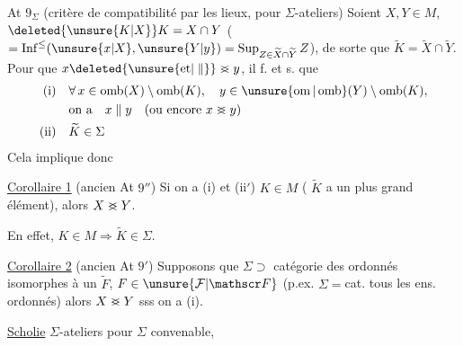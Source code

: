 At $9_{\Sigma}$ (critère de compatibilité par les lieux, pour $\Sigma$-ateliers) Soient $X,Y\in M$,  $\deleted{\unsure{K|X}}K=X\cap Y$ ($=\operatorname{Inf}^{\leq}(\unsure{x|X},\unsure{Y|y})=\operatorname{Sup}_{Z\in\widetilde X\cap\widetilde Y} Z$), de sorte que $\widetilde K=\widetilde X\cap\widetilde Y$. Pour que $x\deleted{\unsure{\text{et}|\parallel}}\mathrel{>\mkern-14mu<}y$,   il \deleted{\unsure{(}}f. et \deleted{\unsure{)}}s. que
\[
\begin{aligned}
\text{(i)}\quad &\forall\,x\in\operatorname{omb}(X)\setminus\operatorname{omb}(K),\quad y\in\unsure{\operatorname{om}|\operatorname{omb}}(Y)\setminus\operatorname{omb}(K),\\
&\text{on a}\quad x\parallel y\quad\text{(ou encore }x\mathrel{>\mkern-14mu<}y\text{)}\\
\text{(ii)}\quad &\widetilde K\in\Sigma
\end{aligned}
\]
Cela implique donc

\uline{Corollaire 1} (ancien At $9''$) Si on a (i) et (ii$'$) $K\in M$ ( $\widetilde K$ a un plus grand élément), alors $X\mathrel{>\mkern-14mu<}Y$.

En effet,  $K\in M\Longrightarrow\widetilde K\in\Sigma$.

\uline{Corollaire 2} (ancien At $9'$) Supposons que $\Sigma\supset$ catégorie des  ordonnés isomorphes à un $\widetilde F$, $F\in\unsure{\mathcal F|\mathscr F}$ (p.ex. $\Sigma={}$cat.  tous les ens. ordonnés) alors $X\mathrel{>\mkern-14mu<}Y$ sss on a (i).


\uline{Scholie}     $\Sigma$-ateliers pour $\Sigma$ convenable, 

